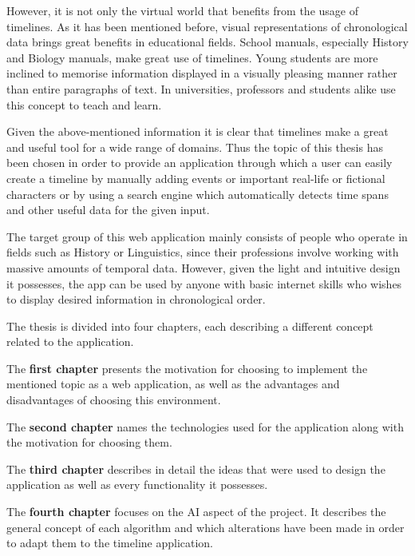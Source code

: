 \documentclass{report}
\begin{document}
However, it is not only the virtual world that benefits from the usage of timelines. As it has been mentioned before, visual representations of chronological data brings great benefits in educational fields. School manuals, especially History and Biology manuals, make great use of timelines. Young students are more inclined to memorise information displayed in a visually pleasing manner rather than entire paragraphs of text. In universities, professors and students alike use this concept to teach and learn. \par

Given the above-mentioned information it is clear that timelines make a great and useful tool for a wide range of domains. Thus the topic of this thesis has been chosen in order to provide an application through which a user can easily create a timeline by manually adding events or important real-life or fictional characters or by using a search engine which automatically detects time spans and other useful data for the given input. \par

The target group of this web application mainly consists of people who operate in fields such as History or Linguistics, since their professions involve working with massive amounts of temporal data. However, given the light and intuitive design it possesses, the app can be used by anyone with basic internet skills who wishes to display desired information in chronological order. \par

The thesis is divided into four chapters, each describing a different concept related to the application. \par

The \textbf{first chapter} presents the motivation for choosing to implement the mentioned topic as a web application, as well as the advantages and disadvantages of choosing this environment. \par

The \textbf{second chapter} names the technologies used for the application along with the motivation for choosing them. \par

The \textbf{third chapter} describes in detail the ideas that were used to design the application as well as every functionality it possesses. \par

The \textbf{fourth chapter} focuses on the AI aspect of the project. It describes the general concept of each algorithm and which alterations have been made in order to adapt them to the timeline application. \par
\end{document}
